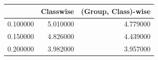 \begin{tabular}{lrr}
\toprule
 & Classwise & (Group, Class)-wise \\
\midrule
0.100000 & 5.010000 & 4.779000 \\
0.150000 & 4.826000 & 4.439000 \\
0.200000 & 3.982000 & 3.957000 \\
\bottomrule
\end{tabular}
